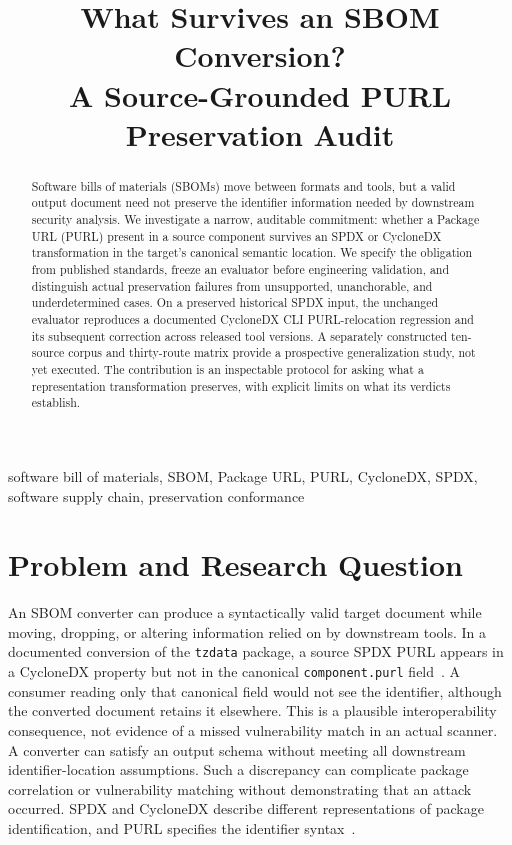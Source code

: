 \documentclass[conference,10pt]{IEEEtran}
\title{What Survives an SBOM Conversion?\\
A Source-Grounded PURL Preservation Audit}
\author{\IEEEauthorblockN{Denise M. Case}
\IEEEauthorblockA{School of Computer Science and Information Systems\\
Northwest Missouri State University\\
Maryville, Missouri, USA}}
\begin{document}
\maketitle

\begin{abstract}
  Software bills of materials (SBOMs) move between formats and tools,
  but a valid output document need not preserve the identifier information
  needed by downstream security analysis.
  We investigate a narrow, auditable commitment:
  whether a Package URL (PURL) present in a source component survives
  an SPDX or CycloneDX transformation in the target's canonical semantic location.
  We specify the obligation from published standards,
  freeze an evaluator before engineering validation, and
  distinguish actual preservation failures from
  unsupported, unanchorable, and underdetermined cases.
  On a preserved historical SPDX input,
  the unchanged evaluator reproduces a documented
  CycloneDX CLI PURL-relocation regression and
  its subsequent correction across released tool versions.
  A separately constructed ten-source corpus and thirty-route matrix
  provide a prospective generalization study, not yet executed.
  The contribution is an inspectable protocol
  for asking what a representation transformation preserves,
  with explicit limits on what its verdicts establish.
\end{abstract}

\begin{IEEEkeywords}
  software bill of materials,
  SBOM,
  Package URL,
  PURL,
  CycloneDX,
  SPDX,
  software supply chain,
  preservation conformance
\end{IEEEkeywords}

\section{Problem and Research Question}
An SBOM converter can produce a syntactically valid target document while
moving, dropping, or altering information relied on by downstream tools.
In a documented conversion of the \texttt{tzdata} package, a source SPDX
PURL appears in a CycloneDX property but not in the canonical
\texttt{component.purl} field~\cite{issue424}.
A consumer reading only that canonical field would not see the identifier,
although the converted document retains it elsewhere.
This is a plausible interoperability consequence,
not evidence of a missed vulnerability match in an actual scanner.
A converter can satisfy an output schema without meeting all downstream
identifier-location assumptions.
Such a discrepancy can complicate package correlation or vulnerability matching
without demonstrating that an attack occurred.
SPDX and CycloneDX describe different representations of package identification, and
PURL specifies the identifier syntax~\cite{spdx,cyclonedx,purl}.
\end{document}

